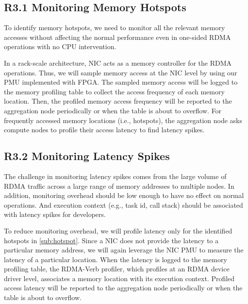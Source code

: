 \subsection{R3.1 Monitoring Memory Hotspots}
\label{sub:hotspot}

\boxbeg
\begin{Challenge}
  To identify memory hotspots, we need to monitor all the relevant
  memory accesses without affecting the normal performance even in
  one-sided RDMA operations with no CPU intervention.
\end{Challenge}
\boxend

In a rack-scale architecture, NIC acts as a memory controller for the
RDMA operations. Thus, we will sample memory access at the NIC level by using our
PMU implemented with FPGA. The sampled memory access will be logged to
the memory profiling table to collect the access frequency of each
memory location. Then, the profiled memory access frequency will be reported to
the aggregation node periodically or when the table is about to
overflow. For frequently accessed memory locations (i.e., hotspots),
the aggregation node asks compute nodes to profile their access
latency to find latency spikes.

\subsection{R3.2 Monitoring Latency Spikes}
\label{sub:latency}

\boxbeg
\begin{Challenge}
  The challenge in monitoring latency spikes comes from the large
  volume of RDMA traffic across a large range of memory addresses to
  multiple nodes. In addition, monitoring overhead should be low enough to
  have no effect on normal operations. And execution context (e.g., task id,
  call stack) should be associated with latency spikes for developers.
\end{Challenge}
\boxend

To reduce monitoring overhead, we will profile latency only for the
identified hotspots in \autoref{sub:hotspot}. Since a NIC does not
provide the latency to a particular memory address, we will again
leverage the NIC PMU to measure the latency of a particular
location. When the latency is logged to the memory
profiling table, the RDMA-Verb profiler, which profiles at an RDMA device
driver level, associates a memory location with its execution
context. Profiled access latency will be reported to the aggregation
node periodically or when the table is about to overflow.

